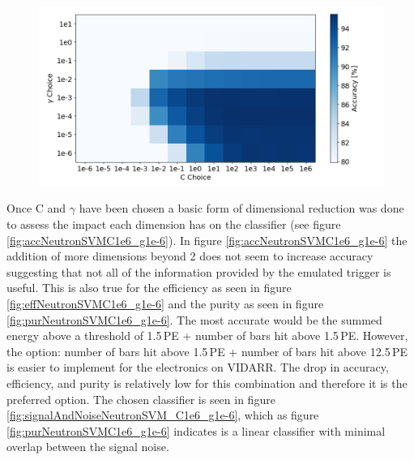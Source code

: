 \begin{figure}[htbp]
\centering
\includegraphics[width=0.9\linewidth]{Chapter4/Figs/Raster/GammaCGridSearchNeutron.png}
\label{fig:GammaCGridSearchNeutron}
\end{figure}

Once C and $\gamma$ have been chosen a basic form of dimensional reduction was done to assess the impact each dimension has on the classifier (see figure \ref{fig:accNeutronSVMC1e6_g1e-6}). In figure \ref{fig:accNeutronSVMC1e6_g1e-6} the addition of more dimensions beyond 2 does not seem to increase accuracy suggesting that not all of the information provided by the emulated trigger is useful. This is also true for the efficiency as seen in figure \ref{fig:effNeutronSVMC1e6_g1e-6} and the purity as seen in figure \ref{fig:purNeutronSVMC1e6_g1e-6}. The most accurate would be the summed energy above a threshold of 1.5\,PE + number of bars hit above 1.5\,PE. However, the option: number of bars hit above 1.5\,PE + number of bars hit above 12.5\,PE is easier to implement for the electronics on VIDARR. The drop in accuracy, efficiency, and purity is relatively low for this combination and therefore it is the preferred option. The chosen classifier is seen in figure \ref{fig:signalAndNoiseNeutronSVM_C1e6_g1e-6}, which as figure \ref{fig:purNeutronSVMC1e6_g1e-6} indicates is a linear classifier with minimal overlap between the signal noise.

